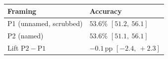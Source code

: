 \begin{tabular}{@{}l l@{}}
\toprule
Framing & Accuracy \\
\midrule
P1 (unnamed, scrubbed) & $53.6\%$ \scriptsize{$[51.2,\ 56.1]$} \\
P2 (named)             & $53.6\%$ \scriptsize{$[51.1,\ 56.1]$} \\
\midrule
Lift $\mathrm{P2}-\mathrm{P1}$ & $-0.1$\,pp \scriptsize{$[-2.4,\ +2.3]$} \\
\bottomrule
\end{tabular}
